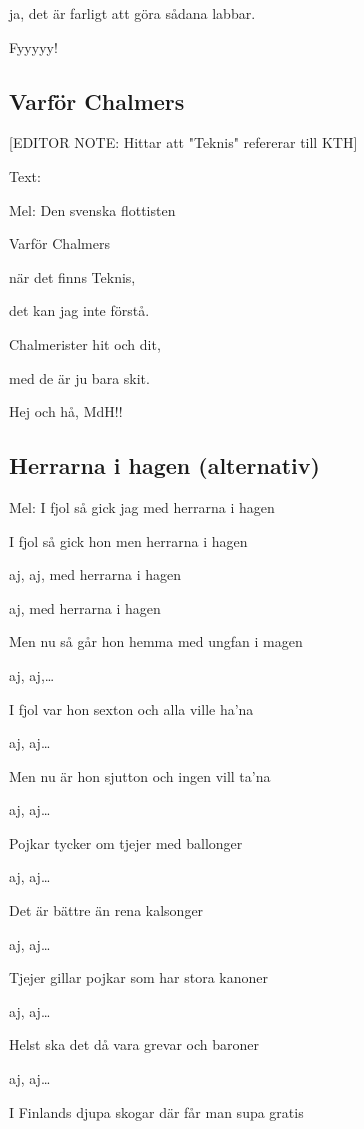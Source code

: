 ja, det är farligt att göra sådana labbar.

Fyyyyy! \bigskip


\subsection{\textbf{Varför Chalmers}}

[EDITOR NOTE: Hittar att "Teknis" refererar till KTH]

Text: 

Mel: Den svenska flottisten\bigskip

Varför Chalmers

när det finns Teknis,

det kan jag inte förstå.\bigskip

Chalmerister hit och dit,

med de är ju bara skit.

Hej och hå, MdH!! 

\subsection{\textbf{Herrarna i hagen (alternativ)}}

Mel: I fjol så gick jag med herrarna i hagen\bigskip

I fjol så gick hon men herrarna i hagen

aj, aj, med herrarna i hagen

aj, med herrarna i hagen\bigskip

Men nu så går hon hemma med ungfan i magen

aj, aj,…\bigskip

I fjol var hon sexton och alla ville ha’na

aj, aj…\bigskip

Men nu är hon sjutton och ingen vill ta’na

aj, aj…\bigskip

Pojkar tycker om tjejer med ballonger

aj, aj…\bigskip

Det är bättre än rena kalsonger

aj, aj…\bigskip

Tjejer gillar pojkar som har stora kanoner

aj, aj…\bigskip

Helst ska det då vara grevar och baroner

aj, aj…\bigskip

I Finlands djupa skogar där får man supa gratis

